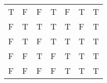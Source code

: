 \documentclass[a4paper, 11pt]{article}
\begin{document}
\begin{enumerate}
\begin{enumerate}
\begin{table}[htbp]
\begin{tabular}{lllllll}
                    T & F & F & T          & F                 & T                      & T                   \\
                    F & T & T & T          & T                 & F                      & T                   \\
                    F & T & F & T          & T                 & T                      & T                   \\
                    F & F & T & F          & T                 & T                      & T                   \\
                    F & F & F & F          & T                 & T                      & T                   \\
                  \end{tabular}%
                \end{table}%


\end{enumerate}
\end{enumerate}
\end{document}
